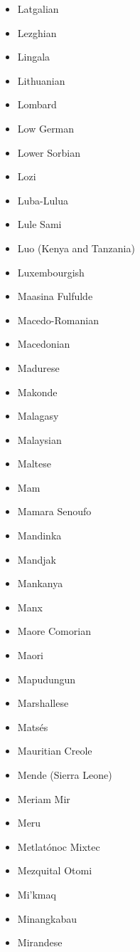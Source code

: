 \documentclass[paper=a4, 12pt]{scrbook}
\begin{document}
\begin{multicols}{3}
\begin{itemize}
        \item Latgalian
        \item Lezghian
        \item Lingala
        \item Lithuanian
        \item Lombard
        \item Low German
        \item Lower Sorbian
        \item Lozi
        \item Luba-Lulua
        \item Lule Sami
        \item Luo (Kenya and Tanzania)
        \item Luxembourgish
        \item Maasina Fulfulde
        \item Macedo-Romanian
        \item Macedonian
        \item Madurese
        \item Makonde
        \item Malagasy
        \item Malaysian
        \item Maltese
        \item Mam
        \item Mamara Senoufo
        \item Mandinka
        \item Mandjak
        \item Mankanya
        \item Manx
        \item Maore Comorian
        \item Maori
        \item Mapudungun
        \item Marshallese
        \item Matsés
        \item Mauritian Creole
        \item Mende (Sierra Leone)
        \item Meriam Mir
        \item Meru
        \item Metlatónoc Mixtec
        \item Mezquital Otomi
        \item Mi’kmaq
        \item Minangkabau
        \item Mirandese

\end{itemize}
\end{multicols}
\end{document}
